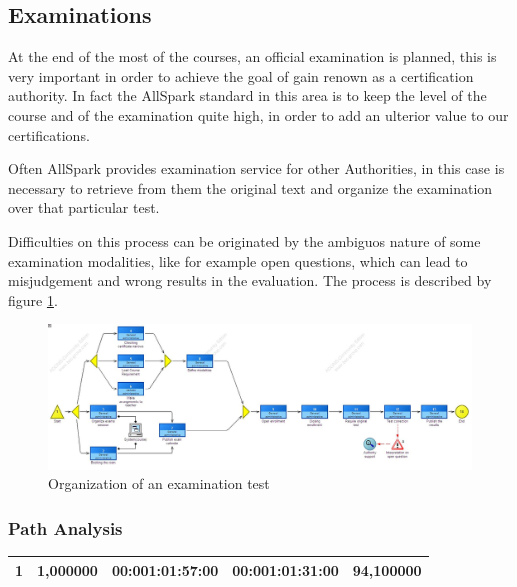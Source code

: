 \subsection{Examinations}
At the end of the most of the courses, an official examination is planned,
this is very important in order to achieve the goal of gain renown as a
certification authority. In fact the AllSpark standard in this area is to
keep the level of the course and of the examination quite high, in order to
add an ulterior value to our certifications.

Often AllSpark provides examination service for other Authorities, in this
case is necessary to retrieve from them the original text and organize the
examination over that particular test.

Difficulties on this process can be originated by the ambiguos nature of
some examination modalities, like for example open questions, which can
lead to misjudgement and wrong results in the evaluation.
The process is described by figure \ref{2img:examination}.

\begin{figure}[!ht]
\centering
\includegraphics[scale=0.35, angle=90]{assign2/adonis/imgs/examination.jpg}
\caption{Organization of an examination test}
\label{2img:examination}
\end{figure}



\subsubsection{Path Analysis}

\begin{table}[ht!]
\centering
\begin{tabular}{|l|l|l|l|l|}
\hline
1&1,000000&00:001:01:57:00&00:001:01:31:00&94,100000\\
\hline
\end{tabular}
\end{table}

